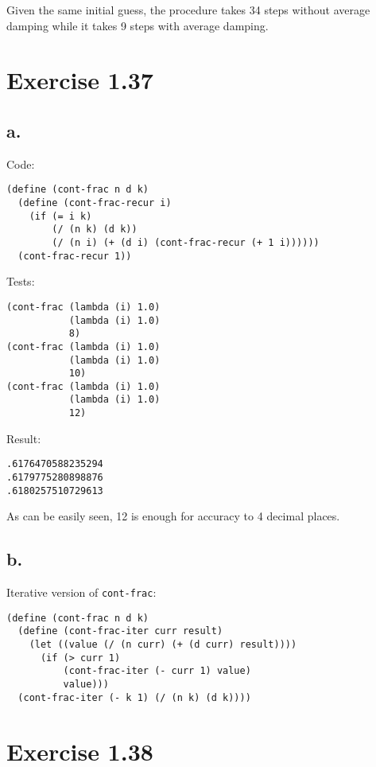 \documentclass[../main.tex]{subfiles}
\begin{document}
Given the same initial guess, the procedure takes 34 steps without
 average damping while it takes 9 steps with average damping.

\section{Exercise 1.37}

\subsection*{a.}

Code:

\begin{lstlisting}
(define (cont-frac n d k)
  (define (cont-frac-recur i)
    (if (= i k)
        (/ (n k) (d k))
        (/ (n i) (+ (d i) (cont-frac-recur (+ 1 i))))))
  (cont-frac-recur 1))
\end{lstlisting}

Tests:

\begin{lstlisting}
(cont-frac (lambda (i) 1.0)
           (lambda (i) 1.0)
           8)
(cont-frac (lambda (i) 1.0)
           (lambda (i) 1.0)
           10)
(cont-frac (lambda (i) 1.0)
           (lambda (i) 1.0)
           12)
\end{lstlisting}

Result:

\begin{lstlisting}
.6176470588235294
.6179775280898876
.6180257510729613
\end{lstlisting}

As can be easily seen, 12 is enough for accuracy to 4 decimal places.

\subsection*{b.}

Iterative version of \lstinline{cont-frac}:

\begin{lstlisting}
(define (cont-frac n d k)
  (define (cont-frac-iter curr result)
    (let ((value (/ (n curr) (+ (d curr) result))))
      (if (> curr 1)
          (cont-frac-iter (- curr 1) value)
          value)))
  (cont-frac-iter (- k 1) (/ (n k) (d k))))
\end{lstlisting}

\section{Exercise 1.38}
\end{document}
